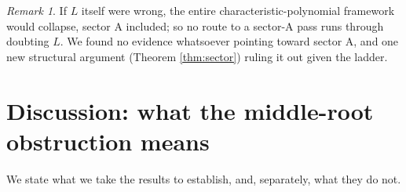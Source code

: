 \documentclass[11pt,reqno]{amsart}
\theoremstyle{plain}
\theoremstyle{definition}
\theoremstyle{remark}
\newtheorem{remark}[theorem]{Remark}
\begin{document}
\begin{remark}
If $L$ itself were wrong, the entire characteristic-polynomial framework would collapse, sector A
included; so no route to a sector-A pass runs through doubting $L$. We found no evidence
whatsoever pointing toward sector A, and one new structural argument (Theorem \ref{thm:sector})
ruling it out given the ladder.
\end{remark}

\section{Discussion: what the middle-root obstruction means}\label{sec:discussion}

We state what we take the results to establish, and, separately, what they do not.
\end{document}
